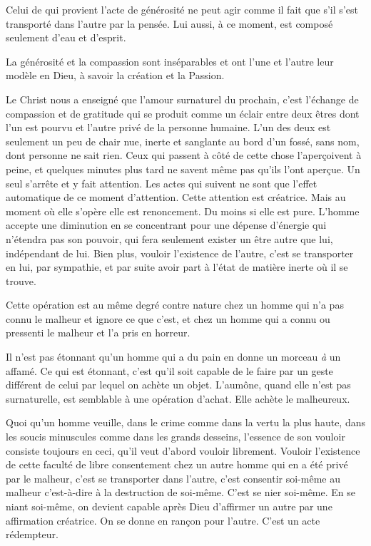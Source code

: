 \documentclass[french,twoside]{book} %
\begin{document}
Celui de qui provient l'acte de générosité ne peut agir comme il fait que s'il s'est transporté dans l'autre par la pensée. Lui aussi, à ce moment, est composé seulement d'eau et d'esprit.\par
La générosité et la compassion sont inséparables et ont l'une et l'autre leur modèle en Dieu, à savoir la création et la Passion.\par
Le Christ nous a enseigné que l'amour surnaturel du prochain, c'est l'échange de compassion et de gratitude qui se produit comme un éclair entre deux êtres dont l'un est pourvu et l'autre privé de la personne humaine. L'un des deux est seulement un peu de chair nue, inerte et sanglante au bord d'un fossé, sans nom, dont personne ne sait rien. Ceux qui passent à côté de cette chose l'aperçoivent à peine, et quelques minutes plus tard ne savent même pas qu'ils l'ont aperçue. Un seul s'arrête et y fait attention. Les actes qui suivent ne sont que l'effet automatique de ce moment d'attention. Cette attention est créatrice. Mais au moment où elle s'opère elle est renoncement. Du moins si elle est pure. L'homme accepte une diminution en se concentrant pour une dépense d'énergie qui n'étendra pas son pouvoir, qui fera seulement exister un être autre que lui, indépendant de lui. Bien plus, vouloir l'existence de l'autre, c'est se transporter en lui, par sympathie, et par suite avoir part à l'état de matière inerte où il se trouve.\par
Cette opération est au même degré contre nature chez un homme qui n'a pas connu le malheur et ignore ce que c'est, et chez un homme qui a connu ou pressenti le malheur et l'a pris en horreur.\par
Il n'est pas étonnant qu'un homme qui a du pain en donne un morceau {\itshape à} un affamé. Ce qui est étonnant, c'est qu'il soit capable de le faire par un geste différent de celui par lequel on achète un objet. L'aumône, quand elle n'est pas surnaturelle, est semblable à une opération d'achat. Elle achète le malheureux.\par
Quoi qu'un homme veuille, dans le crime comme dans la vertu la plus haute, dans les soucis minuscules comme dans les grands desseins, l'essence de son vouloir consiste toujours en ceci, qu'il veut d'abord vouloir librement. Vouloir l'existence de cette faculté de libre consentement chez un autre homme qui en a été privé par le malheur, c'est se transporter dans l'autre, c'est consentir soi-même au malheur c'est-à-dire à la destruction de soi-même. C'est se nier soi-même. En se niant soi-même, on devient capable après Dieu d'affirmer un autre par une affirmation créatrice. On se donne en rançon pour l'autre. C'est un acte rédempteur.\par
\end{document}
